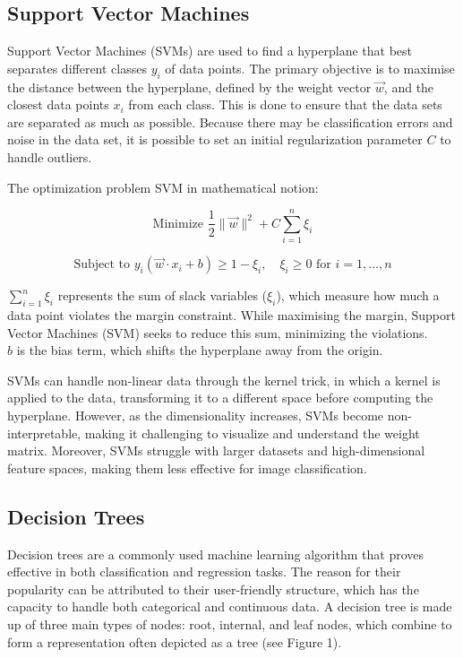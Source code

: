 \subsection{Support Vector Machines}

Support Vector Machines (SVMs) \cite{boser1992training} are used to find a hyperplane that best separates different classes $y_i$ of data points. The primary objective is to maximise the distance between the hyperplane, defined by the weight vector $\vec{w}$, and the closest data points $x_i$ from each class. This is done to ensure that the data sets are separated as much as possible. Because there may be classification errors and noise in the data set, it is possible to set an initial regularization parameter $C$ to handle outliers.

The optimization problem SVM in mathematical notion:

$$\text{Minimize } \frac{1}{2} \|\vec{w}\|^2 + C \sum_{i=1}^{n} \xi_i$$

$$\text{Subject to } y_i (\vec{w} \cdot x_i + b) \geq 1 - \xi_i, \quad \xi_i \geq 0 \text{ for } i = 1, \ldots, n$$

$\sum_{i=1}^{n} \xi_i$ represents the sum of slack variables ($\xi_i$), which measure how much a data point violates the margin constraint. While maximising the margin, Support Vector Machines (SVM) seeks to reduce this sum, minimizing the violations.\\
$ b $ is the bias term, which shifts the hyperplane away from the origin.

SVMs can handle non-linear data through the kernel trick, in which a kernel is applied to the data, transforming it to a different space before computing the hyperplane. However, as the dimensionality increases, SVMs become non-interpretable, making it challenging to visualize and understand the weight matrix. Moreover, SVMs struggle with larger datasets and high-dimensional feature spaces, making them less effective for image classification.


\subsection{Decision Trees}
\label{decision_tree}


Decision trees are a commonly used machine learning algorithm that proves effective in both classification and regression tasks. The reason for their popularity can be attributed to their user-friendly structure, which has the capacity to handle both categorical and continuous data. A decision tree is made up of three main types of nodes: root, internal, and leaf nodes, which combine to form a representation often depicted as a tree (see Figure 1).

